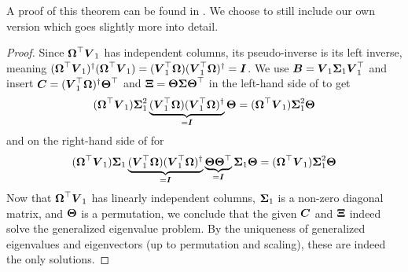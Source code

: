 A proof of this theorem can be found in \cite[theorem~3]{lin2017randomized}. We
choose to still include our own version which goes slightly more into detail.
\begin{proof}
    Since $\boldsymbol{\Omega}^{\top} \boldsymbol{V}_1$ has independent columns, its pseudo-inverse
    is its left inverse, meaning 
    $(\boldsymbol{\Omega}^{\top} \boldsymbol{V}_1)^{\dagger} (\boldsymbol{\Omega}^{\top} \boldsymbol{V}_1) = ( \boldsymbol{V}_1^{\top}\boldsymbol{\Omega}) ( \boldsymbol{V}_1^{\top}\boldsymbol{\Omega})^{\dagger} = \boldsymbol{I}$.
    We use $\boldsymbol{B} = \boldsymbol{V}_1 \boldsymbol{\Sigma}_1 \boldsymbol{V}_1^{\top}$ and insert
    $\boldsymbol{C} = (\boldsymbol{V}_1^{\top} \boldsymbol{\Omega})^{\dagger} \boldsymbol{\Theta}^{\top}$
    and $\boldsymbol{\Xi} = \boldsymbol{\Theta} \boldsymbol{\Sigma} \boldsymbol{\Theta}^{\top}$ in the
    left-hand side of  to get
    \begin{equation}
        (\boldsymbol{\Omega}^{\top} \boldsymbol{V}_1) \boldsymbol{\Sigma}_1^2 \underbrace{(\boldsymbol{V}_1^{\top} \boldsymbol{\Omega}) (\boldsymbol{V}_1^{\top} \boldsymbol{\Omega})^{\dagger}}_{=\boldsymbol{I}} \boldsymbol{\Theta} = (\boldsymbol{\Omega}^{\top} \boldsymbol{V}_1) \boldsymbol{\Sigma}_1^2 \boldsymbol{\Theta}
    \end{equation}
    and on the right-hand side of  for
    \begin{equation}
        (\boldsymbol{\Omega}^{\top} \boldsymbol{V}_1) \boldsymbol{\Sigma}_1 \underbrace{(\boldsymbol{V}_1^{\top} \boldsymbol{\Omega}) (\boldsymbol{V}_1^{\top} \boldsymbol{\Omega})^{\dagger}}_{=\boldsymbol{I}} \underbrace{\boldsymbol{\Theta} \boldsymbol{\Theta}^{\top}}_{=\boldsymbol{I}} \boldsymbol{\Sigma}_1 \boldsymbol{\Theta} = (\boldsymbol{\Omega}^{\top} \boldsymbol{V}_1) \boldsymbol{\Sigma}_1^2 \boldsymbol{\Theta}
    \end{equation}
    Now that $\boldsymbol{\Omega}^{\top} \boldsymbol{V}_1$ has linearly independent columns, $\boldsymbol{\Sigma}_1$ is a non-zero
    diagonal matrix, and $\boldsymbol{\Theta}$ is a permutation, we conclude that
    the given $\boldsymbol{C}$ and $\boldsymbol{\Xi}$ indeed solve the generalized eigenvalue problem.
    By the uniqueness of generalized eigenvalues and eigenvectors (up to
    permutation and scaling), these are indeed the only solutions.


\end{proof}
